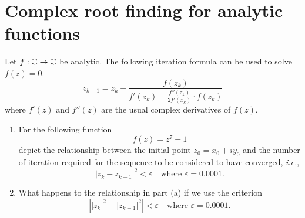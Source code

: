 \section{Complex root finding for analytic functions}
Let \(f:\mathbb{C}\to\mathbb{C}\) be analytic.
The following iteration formula can be used to solve \(f(z)=0\).
\[ z_{k+1}=z_k-\frac{f(z_k)}{f'(z_k)-\frac{f''(z_k)}{2f'(x_k)}\cdot f(z_k)} \]
where \(f'(z)\) and \(f''(z)\) are the usual complex derivatives of \(f(z)\).
\begin{enumerate}
	\item For the following function
	\[ f(z)=z^7-1 \]
	depict the relationship between the initial point \(z_0=x_0+i y_0\) and the number of iteration required for the sequence to be considered to have converged, \textit{i.e.},
	\[ |z_k - z_{k-1}|^2 < \varepsilon \quad \text{where } \varepsilon=0.0001. \]
	\item What happens to the relationship in part (a) if we use the criterion 
	\[ \left| |z_k|^2 - |z_{k-1}|^2\right| < \varepsilon \quad \text{where } \varepsilon=0.0001. \]
\end{enumerate}